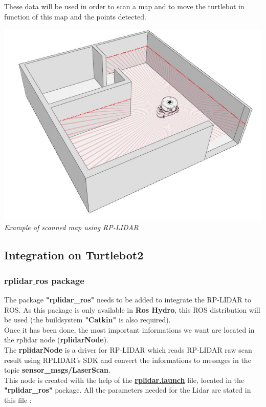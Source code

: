 \documentclass[10pt,a4paper]{article}
\begin{document}
These data will be used in order to scan a map and to move the turtlebot in function of this map and the points detected. 

\begin{center}
\includegraphics[scale=0.5]{images/RPLIDAR_room.jpg}\\
\textit{Example of scanned map using RP-LIDAR}
\end{center}

\subsection{Integration on Turtlebot2}

\subsubsection{rplidar$\_$ros package}
The package \textbf{"rplidar\_ros"} needs to be added to integrate the RP-LIDAR to ROS. 
As this package is only available in \textbf{Ros Hydro}, this ROS distribution will be used (the buildsystem \textbf{"Catkin"} is also required).\\
Once it has been done, the most important informations we want are located in the rplidar node (\textbf{rplidarNode}).\\
The \textbf{rplidarNode} is a driver for RP-LIDAR which reads RP-LIDAR raw scan result using RPLIDAR's SDK and convert the informations to messages in the topic \textbf{sensor\_msgs/LaserScan}.\\

This node is created with the help of the \textbf{\underline{rplidar.launch}} file, located in the \textbf{"rplidar\_ros"} package.
All the parameters needed for the Lidar are stated in this file : \\
\end{document}
